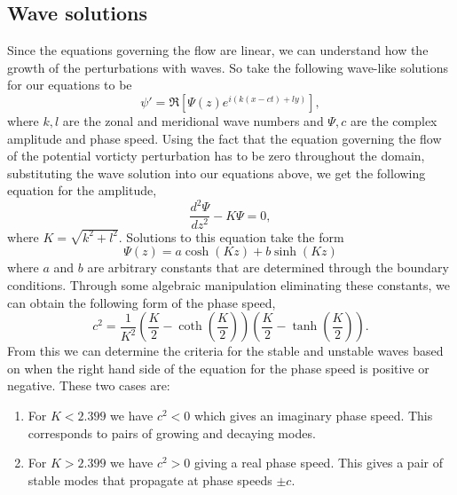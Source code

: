 \documentclass[a4paper,12pt]{article}
\begin{document}
\subsection{Wave solutions}
Since the equations governing the flow are linear, we can understand how the growth of the perturbations with waves. So take the following wave-like solutions for our equations to be
\begin{equation}
  \psi' = \Re\left[\Psi(z)e^{i(k(x-ct)+ly)}\right],
\end{equation}
where $k,l$ are the zonal and meridional wave numbers and $\Psi,c$ are the complex amplitude and phase speed. Using the fact that the equation governing the flow of the potential vorticty perturbation has to be zero throughout the domain, substituting the wave solution into our equations above, we get the following equation for the amplitude, 
\begin{equation}
  \frac{d^2\Psi}{dz^2} - K\Psi = 0,
\end{equation}
where $K=\sqrt{k^2+l^2}$. Solutions to this equation take the form 
\begin{equation}
  \Psi(z) = a\cosh(Kz)+b\sinh(Kz)
\end{equation}
where $a$ and $b$ are arbitrary constants that are determined through the boundary conditions. Through some algebraic manipulation eliminating these constants, we can obtain the following form of the phase speed,
\begin{equation}
  c^2 = \frac{1}{K^2}\left(\frac{K}{2}-\coth\left(\frac{K}{2}\right)\right)\left(\frac{K}{2}-\tanh\left(\frac{K}{2}\right)\right).
  \label{phasespeed}
\end{equation}
From this we can determine the criteria for the stable and unstable waves based on when the right hand side of the equation for the phase speed is positive or negative. These two cases are:
\begin{enumerate}
  \item For $K<2.399$ we have $c^2<0$ which gives an imaginary phase speed. This corresponds to pairs of growing and decaying modes. 
  \item For $K>2.399$ we have $c^2>0$ giving a real phase speed. This gives a pair of stable modes that propagate at phase speeds $\pm c$. 
\end{enumerate}
\end{document}
